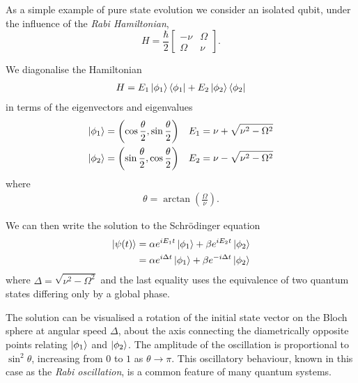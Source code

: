 As a simple example of pure state evolution we consider an isolated qubit, under the influence of the \textit{Rabi Hamiltonian},
\begin{equation} \label{rabi_hamiltonian}
  H = \frac{\hbar}{2}
\begin{bmatrix}
  -\nu & \Omega \\
  \Omega & \nu 
\end{bmatrix}.
\end{equation}

We diagonalise the Hamiltonian
\begin{align}
  H = E_1 \left\vert\phi_1\right\rangle\left\langle \phi_1\right\vert + E_2 \left\vert\phi_2\right\rangle\left\langle \phi_2\right\vert
\end{align}
in terms of the eigenvectors and eigenvalues
\begin{align}
  \left\vert\phi_1\right\rangle &=  \left(\cos\frac{\theta}{2}, \sin\frac{\theta}{2}\right)  &E_1 = \nu + \sqrt{\nu^2 - \Omega^2} \\
  \left\vert\phi_2\right\rangle &=  \left(\sin\frac{\theta}{2}, \cos\frac{\theta}{2}\right)  &E_2 = \nu - \sqrt{\nu^2 - \Omega^2} 
\end{align}
where
\begin{align}
  \theta = \arctan\left(\frac{\Omega}{\nu}\right).
\end{align}

We can then write the solution to the Schr\"odinger equation
\begin{align}
  \left\vert\psi(t)\right\rangle &= \alpha e^{iE_1t}\left\vert\phi_1\right\rangle +  \beta e^{iE_2t} \left\vert\phi_2\right\rangle \\
  &= \alpha e^{i\Delta t}\left\vert\phi_1\right\rangle +  \beta e^{- i\Delta t} \left\vert\phi_2\right\rangle 
\end{align}
where $\Delta = \sqrt{\nu^2 - \Omega^2}$ and the last equality uses the equivalence of two quantum states differing only by a global phase. 

The solution can be visualised a rotation of the initial state vector on the Bloch sphere at angular speed $\Delta$, about the axis connecting the diametrically opposite points relating $\left\vert\phi_1\right\rangle$ and $\left\vert\phi_2\right\rangle$. The amplitude of the oscillation is proportional to $\sin^2\theta$, increasing from $0$ to $1$ as $\theta \rightarrow \pi$.  This oscillatory behaviour, known in this case as the \textit{Rabi oscillation}, is a common feature of many quantum systems.

